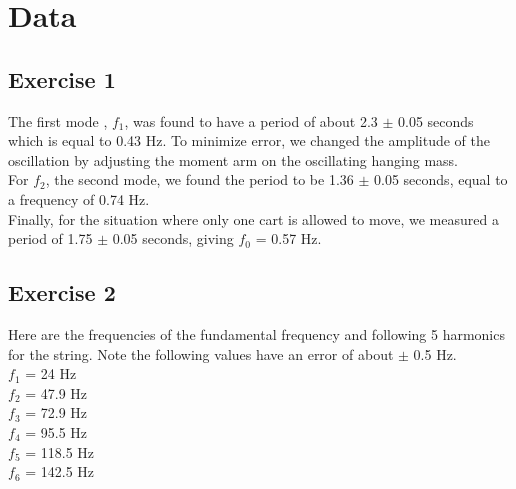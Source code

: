 \documentclass[a4paper,12pt]{article}
\begin{document}
\section{Data}
\subsection{Exercise 1}
The first mode , $f_1$, was found to have a period of about 2.3 $\pm$
0.05 seconds which is equal to 0.43 Hz. To minimize error, we changed
the amplitude of the oscillation by adjusting the moment arm on the
oscillating hanging mass. \\

For $f_2$, the second mode, we found the period to be 1.36 $\pm$ 0.05
seconds, equal to a frequency of 0.74 Hz. \\

Finally, for the situation where only one cart is allowed to move, we
measured a period of 1.75 $\pm$ 0.05 seconds, giving $f_0$ = 0.57
Hz. 

\subsection{Exercise 2}
Here are the frequencies of the fundamental frequency and following 5
harmonics for the string. Note the following values have an error of
about $\pm$ 0.5 Hz. \\

$f_1$ = 24 Hz \\
$f_2$ = 47.9 Hz \\
$f_3$ = 72.9 Hz \\
$f_4$ = 95.5 Hz \\
$f_5$ = 118.5 Hz \\
$f_6$ = 142.5 Hz \\

\newpage
\end{document}
